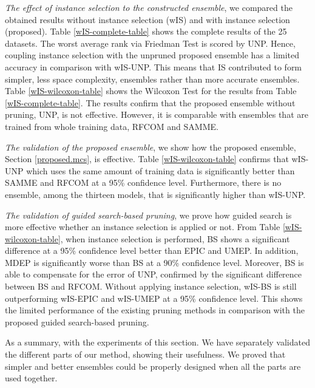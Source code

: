 \textit{The effect of instance selection to the constructed ensemble}, we compared the obtained results without instance selection (wIS) and with instance selection (proposed). Table \ref{wIS-complete-table} shows the complete results of the 25 datasets. The worst average rank via Friedman Test \cite{demsar2006} is scored by UNP. Hence, coupling instance selection with the unpruned proposed ensemble has a limited accuracy in comparison with wIS-UNP. This means that IS contributed to form simpler, less space complexity, ensembles rather than more accurate ensembles. Table \ref{wIS-wilcoxon-table} shows the Wilcoxon Test \cite{wilcoxon1945} for the results from Table \ref{wIS-complete-table}. The results confirm that the proposed ensemble without pruning, UNP, is not effective. However, it is comparable with ensembles that are trained from whole training data, RFCOM and SAMME.

\textit{The validation of the proposed ensemble}, we show how the proposed ensemble, Section \ref{proposed.mcs}, is effective. Table \ref{wIS-wilcoxon-table} confirms that wIS-UNP which uses the same amount of training data is significantly better than SAMME and RFCOM at a 95\% confidence level. Furthermore, there is no ensemble, among the thirteen models, that is significantly higher than wIS-UNP.   


\textit{The validation of guided search-based pruning}, we prove how guided search is more effective whether an instance selection is applied or not. From Table \ref{wIS-wilcoxon-table}, when instance selection is performed, BS shows a significant difference at a 95\% confidence level better than EPIC and UMEP. In addition, MDEP is significantly worse than BS at a 90\% confidence level. Moreover, BS is able to compensate for the error of UNP, confirmed by the significant difference between BS and RFCOM. Without applying instance selection, wIS-BS is still outperforming wIS-EPIC and wIS-UMEP at a 95\% confidence level. This shows the limited performance of the existing pruning methods in comparison with the proposed guided search-based pruning. 


As a summary, with the experiments of this section. We have separately validated the different parts of our method, showing their usefulness. We proved that simpler and better ensembles could be properly designed when all the parts are used together.  
\vspace*{.3cm}

